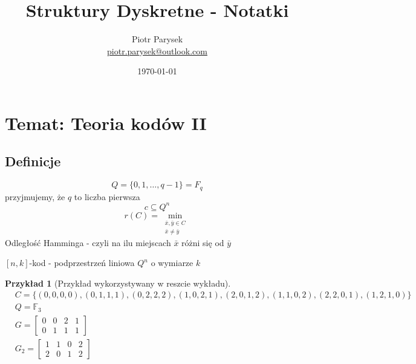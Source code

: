 \documentclass[a4paper,12pt]{article}
\title{Struktury Dyskretne - Notatki}
\author{Piotr Parysek\\
\href{mailto:piotr.parysek@outlook.com}{piotr.parysek@outlook.com} }
\date{\today}
\theoremstyle{definition}%
\newtheorem{example}{Przykład}
\newtheorem*{example*}{Przykład} %
\theoremstyle{definition}
\theoremstyle{problem}
\begin{document}
\maketitle

\tableofcontents
\section[Wykład 11: 25-V-2017 - Temat: Teoria kodów II]{Temat: Teoria kodów II}
\subsection{Definicje}
$$Q=\{0,1,\dots,q-1\}=F_q$$
przyjmujemy, że $q$ to liczba pierwsza
$$c\subseteq Q^n$$
$$r(C)=\min_{\begin{matrix}
\bar{x},\bar{y}\in C\\
\bar{x}\neq\bar{y}
\end{matrix}}$$
Odległość Hamminga - czyli na ilu miejscach $\bar{x}$ różni się od $\bar{y}$

$[n,k]$-kod - podprzestrzeń liniowa $Q^n$ o wymiarze $k$

\begin{example*}[Przykład wykorzystywany w reszcie wykładu]
\begin{align*}
&C=\{(0,0,0,0),(0,1,1,1),(0,2,2,2),(1,0,2,1),(2,0,1,2),(1,1,0,2),(2,2,0,1),(1,2,1,0)\}\\
&Q=\mathbb{F}_3\\
&G=\begin{bmatrix}
0&0&2&1\\0&1&1&1
\end{bmatrix}\\
&G_2=\begin{bmatrix}
1&1&0&2\\2&0&1&2
\end{bmatrix}
\end{align*}
\end{example*}
\end{document}
